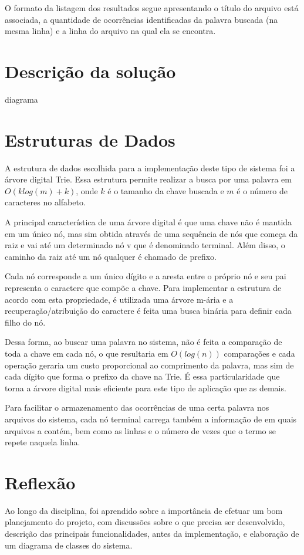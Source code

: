 \documentclass[12pt]{article}
\begin{document}
	O formato da listagem dos resultados segue apresentando o título do arquivo está associada, a quantidade de ocorrências identificadas da palavra buscada (na mesma linha) e a linha do arquivo na qual ela se encontra.

\section{Descrição da solução}
  
diagrama
  
\section{Estruturas de Dados}
A estrutura de dados escolhida para a implementação deste tipo de sistema foi a árvore digital Trie. Essa estrutura permite realizar a busca por uma palavra em $O(k log(m) + k)$, onde $k$ é o tamanho da chave buscada e $m$ é o número de caracteres no alfabeto.

A principal característica de uma árvore digital é que uma chave não é mantida em um único nó, mas sim obtida através de uma sequência de nós que começa da raiz e vai até um determinado nó v que é denominado terminal. Além disso, o caminho da raiz até um nó qualquer é chamado de prefixo.
 
Cada nó corresponde a um único dígito e a aresta entre o próprio nó e seu pai representa o caractere que compõe a chave. Para implementar a estrutura de acordo com esta propriedade, é utilizada uma árvore m-ária e a recuperação/atribuição do caractere é feita uma busca binária para definir cada filho do nó.

Dessa forma, ao buscar uma palavra no sistema, não é feita a comparação de toda a chave em cada nó, o que resultaria em $O(log(n))$ comparações e cada operação geraria um custo proporcional ao comprimento da palavra, mas sim de cada dígito que forma o prefixo da chave na Trie. É essa particularidade que torna a árvore digital mais eficiente para este tipo de aplicação que as demais.

Para facilitar o armazenamento das ocorrências de uma certa palavra nos arquivos do sistema, cada nó terminal carrega também a informação de em quais arquivos a contém, bem como as linhas e o número de vezes que o termo se repete naquela linha.

\section{Reflexão}
Ao longo da disciplina, foi aprendido sobre a importância de efetuar um bom planejamento do projeto, com discussões sobre o que precisa ser desenvolvido, descrição das principais funcionalidades, antes da implementação, e elaboração de um diagrama de classes do sistema.
\end{document}
